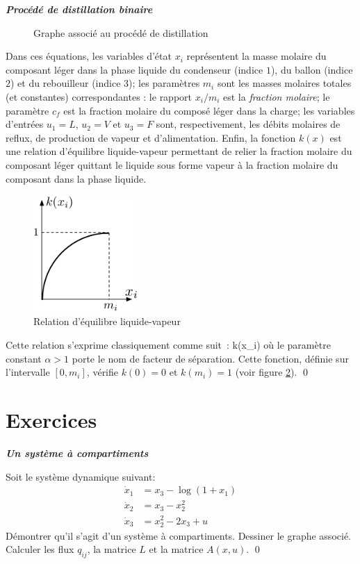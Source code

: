 \begin{exemple}{\bf \em Procédé de distillation binaire}
\begin{figure}[h]
\begin{center}
\caption{Graphe associé au procédé de distillation}
\label{Fig:graphdisti}
\end{center} 
\end{figure}
Dans ces équations, les variables d'état $x_i$ représentent la masse molaire du
composant léger dans la phase liquide du condenseur (indice $1$), du ballon (indice $2$) et du rebouilleur (indice  $3$); les paramètres $m_i$ sont les 
masses molaires totales (et constantes) correspondantes : le rapport $x_i/m_i$ est la {\it fraction molaire}; le paramètre $c_f$
est la fraction molaire du composé léger dans la charge; les variables d'entrées $u_1 =
L$, $u_2 = V$ et
$u_3 = F$ sont, respectivement, les débits molaires de reflux, de production de vapeur et
d'alimentation. Enfin, la fonction $k(x)$ est une relation d'équilibre
liquide-vapeur permettant de relier la fraction molaire du composant léger quittant le liquide
sous forme vapeur à la fraction molaire du composant dans la phase liquide. 
\begin{figure}[ht]
\begin{center}
\includegraphics[width=4cm]{images/separ}
\caption{Relation d'équilibre liquide-vapeur}
\label{Fig:separ}
\end{center} 
\end{figure}

\noindent Cette
relation s'exprime classiquement comme suit~:
\eqnn
k(x_i) \triangleq {}
\eeqnn
où le paramètre constant $\alpha > 1$ porte le nom de facteur de séparation.
Cette fonction, définie sur l'intervalle $[0,m_i]$, vérifie $k(0) = 0$ et
$k(m_i) = 1$ (voir figure \ref{Fig:separ}). \qed  
\end{exemple}

\section{Exercices}

\begin{exercice}{\bf \em Un système à compartiments}

Soit le système dynamique suivant:
\begin{align*}
\dot x_{1} &= x_{3} - \log (1+x_{1}) \\
\dot x_{2} &= x_{3} - x_{2}^2 \\
\dot x_{3} &= x_{2}^2 - 2x_{3} + u
\end{align*}
Démontrer qu'il s'agit d'un système à compartiments. Dessiner le graphe associé. Calculer les flux $q_{ij}$, la matrice $L$ et la matrice $A(x,u)$. \qed
\end{exercice}
\vv

